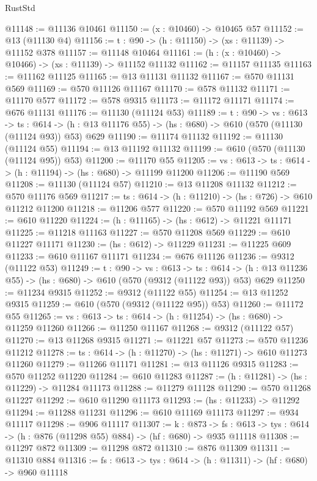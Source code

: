 \begin{lexlean}{RustStd}
\begin{coremodule}
@11148 := @11136 @10461
@11150 := (x : @10460) -> @10465 @57
@11152 := @13 (@11130 @4)
@11156 := {t : @90} -> (h : @11150) -> (xs : @11139) -> @11152 @378
@11157 := @11148 @10464
@11161 := (h : (x : @10460) -> @10466) -> (xs : @11139) -> @11152 @11132
@11162 := @11157 @11135
@11163 := @11162 @11125
@11165 := @13 @11131 @11132
@11167 := @570 @11131 @569
@11169 := @570 @11126 @11167
@11170 := @578 @11132
@11171 := @11170 @577
@11172 := @578 @9315
@11173 := @11172 @11171
@11174 := @676 @11131
@11176 := @11130 (@11124 @53)
@11189 := {t : @90} ->
  {vs : @613} ->
  {ts : @614} -> (h : @13 @11176 @55) -> (hs : @680) -> @610 (@570 (@11130 (@11124 @93)) @53) @629
@11190 := @11174 @11132
@11192 := @11130 (@11124 @55)
@11194 := @13 @11192 @11132
@11199 := @610 (@570 (@11130 (@11124 @95)) @53)
@11200 := @11170 @55
@11205 := {vs : @613} -> {ts : @614} -> (h : @11194) -> (hs : @680) -> @11199 @11200
@11206 := @11190 @569
@11208 := @11130 (@11124 @57)
@11210 := @13 @11208 @11132
@11212 := @570 @11176 @569
@11217 := {ts : @614} -> (h : @11210) -> (hs : @726) -> @610 @11212 @11200
@11218 := @11206 @577
@11220 := @570 @11192 @569
@11221 := @610 @11220
@11224 := (h : @11165) -> (hs : @612) -> @11221 @11171
@11225 := @11218 @11163
@11227 := @570 @11208 @569
@11229 := @610 @11227 @11171
@11230 := (hs : @612) -> @11229
@11231 := @11225 @609
@11233 := @610 @11167 @11171
@11234 := @676 @11126
@11236 := @9312 (@11122 @53)
@11249 := {t : @90} ->
  {vs : @613} ->
  {ts : @614} -> (h : @13 @11236 @55) -> (hs : @680) -> @610 (@570 (@9312 (@11122 @93)) @53) @629
@11250 := @11234 @9315
@11252 := @9312 (@11122 @55)
@11254 := @13 @11252 @9315
@11259 := @610 (@570 (@9312 (@11122 @95)) @53)
@11260 := @11172 @55
@11265 := {vs : @613} -> {ts : @614} -> (h : @11254) -> (hs : @680) -> @11259 @11260
@11266 := @11250 @11167
@11268 := @9312 (@11122 @57)
@11270 := @13 @11268 @9315
@11271 := @11221 @57
@11273 := @570 @11236 @11212
@11278 := {ts : @614} -> (h : @11270) -> (hs : @11271) -> @610 @11273 @11260
@11279 := @11266 @11171
@11281 := @13 @11126 @9315
@11283 := @570 @11252 @11220
@11284 := @610 @11283
@11287 := (h : @11281) -> (hs : @11229) -> @11284 @11173
@11288 := @11279 @11128
@11290 := @570 @11268 @11227
@11292 := @610 @11290 @11173
@11293 := (hs : @11233) -> @11292
@11294 := @11288 @11231
@11296 := @610 @11169 @11173
@11297 := @934 @11117
@11298 := @906 @11117
@11307 := {k : @873} ->
  {fs : @613} -> {tys : @614} -> (h : @876 (@11298 @55) @884) -> (hf : @680) -> @935 @11118
@11308 := @11297 @872
@11309 := @11298 @872
@11310 := @876 @11309
@11311 := @11310 @884
@11316 := {fs : @613} -> {tys : @614} -> (h : @11311) -> (hf : @680) -> @960 @11118

\end{coremodule}
\end{lexlean}
